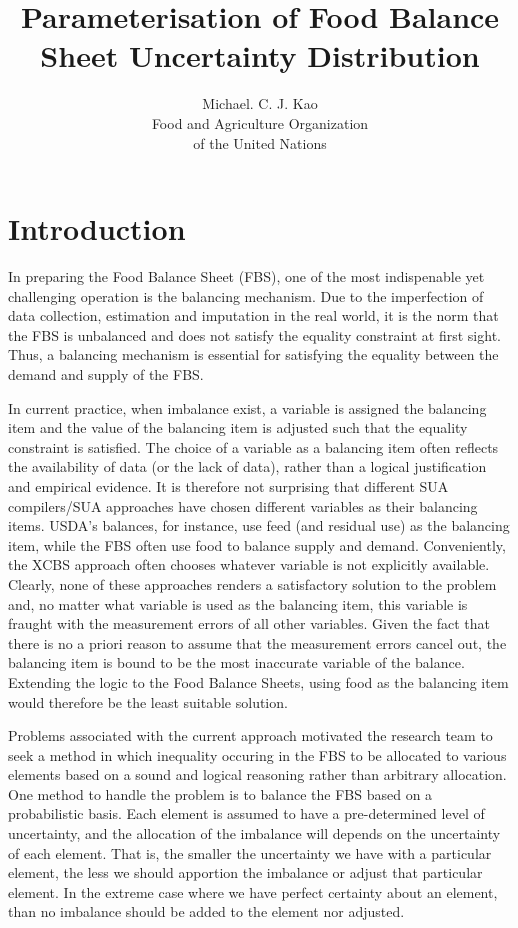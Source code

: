 \documentclass[nojss]{jss}\usepackage[]{graphicx}\usepackage[]{color}
\title{\bf Parameterisation of Food Balance Sheet Uncertainty Distribution}
\author{Michael. C. J. Kao\\ Food and Agriculture Organization \\ of
  the United Nations}
\begin{document}
\section{Introduction}

In preparing the Food Balance Sheet (FBS), one of the most
indispenable yet challenging operation is the balancing mechanism. Due
to the imperfection of data collection, estimation and imputation in
the real world, it is the norm that the FBS is unbalanced and does not
satisfy the equality constraint at first sight. Thus, a balancing
mechanism is essential for satisfying the equality between the demand
and supply of the FBS.


In current practice, when imbalance exist, a variable is assigned the
balancing item and the value of the balancing item is adjusted such
that the equality constraint is satisfied. The choice of a variable as
a balancing item often reflects the availability of data (or the lack
of data), rather than a logical justification and empirical
evidence. It is therefore not surprising that different SUA
compilers/SUA approaches have chosen different variables as their
balancing items. USDA's balances, for instance, use feed (and residual
use) as the balancing item, while the FBS often use food to balance
supply and demand. Conveniently, the XCBS approach often chooses
whatever variable is not explicitly available. Clearly, none of these
approaches renders a satisfactory solution to the problem and, no
matter what variable is used as the balancing item, this variable is
fraught with the measurement errors of all other variables. Given the
fact that there is no a priori reason to assume that the measurement
errors cancel out, the balancing item is bound to be the most
inaccurate variable of the balance.  Extending the logic to the Food
Balance Sheets, using food as the balancing item would therefore be
the least suitable solution.

Problems associated with the current approach motivated the research
team to seek a method in which inequality occuring in the FBS to be
allocated to various elements based on a sound and logical reasoning
rather than arbitrary allocation. One method to handle the problem is
to balance the FBS based on a probabilistic basis. Each element is
assumed to have a pre-determined level of uncertainty, and the
allocation of the imbalance will depends on the uncertainty of each
element. That is, the smaller the uncertainty we have with a
particular element, the less we should apportion the imbalance or
adjust that particular element. In the extreme case where we have
perfect certainty about an element, than no imbalance should be added
to the element nor adjusted.
\end{document}
